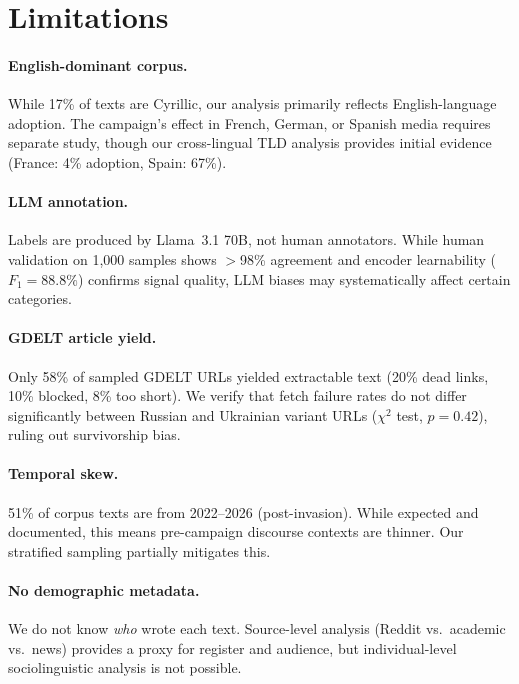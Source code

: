 \documentclass{article}
\begin{document}
\section{Limitations}
\label{sec:limitations}

\paragraph{English-dominant corpus.} While 17\% of texts are Cyrillic, our analysis primarily reflects English-language adoption. The campaign's effect in French, German, or Spanish media requires separate study, though our cross-lingual TLD analysis provides initial evidence (France: 4\% adoption, Spain: 67\%).

\paragraph{LLM annotation.} Labels are produced by Llama~3.1 70B, not human annotators. While human validation on 1,000 samples shows $>$98\% agreement and encoder learnability ($F_1 = 88.8\%$) confirms signal quality, LLM biases may systematically affect certain categories.

\paragraph{GDELT article yield.} Only 58\% of sampled GDELT URLs yielded extractable text (20\% dead links, 10\% blocked, 8\% too short). We verify that fetch failure rates do not differ significantly between Russian and Ukrainian variant URLs ($\chi^2$ test, $p = 0.42$), ruling out survivorship bias.

\paragraph{Temporal skew.} 51\% of corpus texts are from 2022--2026 (post-invasion). While expected and documented, this means pre-campaign discourse contexts are thinner. Our stratified sampling partially mitigates this.

\paragraph{No demographic metadata.} We do not know \textit{who} wrote each text. Source-level analysis (Reddit vs.\ academic vs.\ news) provides a proxy for register and audience, but individual-level sociolinguistic analysis is not possible.
\end{document}
